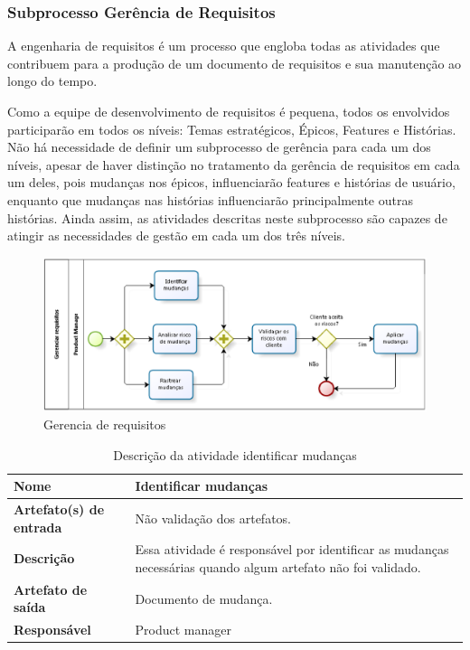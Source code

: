     \subsubsection{Subprocesso Gerência de Requisitos}


    A engenharia de requisitos é um processo que engloba todas as atividades que contribuem para a produção de um documento de requisitos e sua manutenção ao longo do tempo.

    Como a equipe de desenvolvimento de requisitos é pequena, todos os envolvidos participarão em todos os níveis: Temas estratégicos, Épicos, Features e Histórias. Não há necessidade de definir um subprocesso de gerência para cada um dos níveis, apesar de haver distinção no tratamento da gerência de requisitos em cada um deles, pois mudanças nos épicos, influenciarão features e histórias de usuário, enquanto que mudanças nas histórias influenciarão principalmente outras histórias. Ainda assim, as atividades descritas neste subprocesso são capazes de atingir as necessidades de gestão em cada um dos três níveis.

    \begin{figure}[H]
        \centering
        \caption{Gerencia de requisitos}
        \label{processoGerencia}
        \includegraphics[keepaspectratio=true,scale=0.7]{figuras/processoGerencia.eps}
    \end{figure}

    \begin{table}[H]
        \centering
        \label{descricaoAtividades24}
        \caption{Descrição da atividade identificar mudanças}
            \begin{tabular}{|l|p{10cm}|}
            \hline
            \textbf{Nome} & Identificar mudanças \\
            \hline
            \textbf{Artefato(s) de entrada} & Não validação dos artefatos. \\
            \hline
            \textbf{Descrição} & Essa atividade é responsável por identificar as mudanças necessárias quando algum artefato não foi validado. \\
            \hline
            \textbf{Artefato de saída} & Documento de mudança. \\
            \hline
            \textbf{Responsável} & Product manager \\
            \hline
        \end{tabular}
    \end{table}

